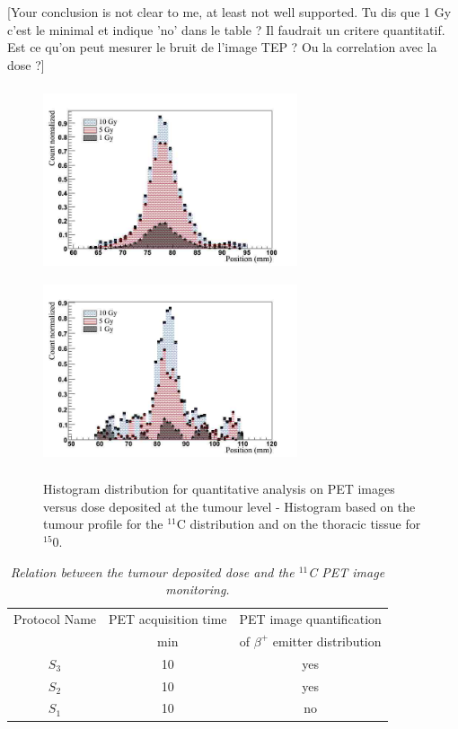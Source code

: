 \documentclass[11pt]{iopart}
\newcommand{\dsnote}[1]{{\color{green}[#1]}} %
\providecommand{\DIFaddendFL}{} %
\begin{document}
\dsnote{Your conclusion is not clear to me, at least not well
  supported. Tu dis que 1 Gy c'est le minimal et indique 'no' dans le
  table ? Il faudrait un critere quantitatif. Est ce qu'on peut
  mesurer le bruit de l'image TEP ? Ou la correlation avec la dose ?}

\begin{figure}[!htbp]
  \DIFaddendFL \begin{center}
    \includegraphics[width=75mm,height=55mm]{figures/histo_lung_C11_paper.jpg}
    \includegraphics[width=75mm,height=55mm]{figures/histo_lung_O15_paper.jpg}
    \caption{Histogram distribution for quantitative analysis on PET
      images versus dose deposited at the tumour level - Histogram
      based on the tumour profile for the $^{11}$C distribution and on
      the thoracic tissue for $^{15}$0.}
  \end{center}
  \label{fig:fig4}
\end{figure}

\begin{table}[htbp]
\begin{center}
\begin{tabular}{|c|c|c|} \hline
 Protocol Name  & PET acquisition time  & PET image quantification       \\
                              &  min                  & of $\beta^{+}$ emitter distribution       \\ \hline \hline

$S_{3}$              & 10                    &  yes                           \\ \hline
$S_{2}$              & 10                    &  yes                           \\ \hline
$S_{1}$              & 10                    &  no                            \\ \hline \hline 

\end{tabular}
\end{center} 
\caption{\it Relation between the tumour deposited dose and the $^{11}$C PET image monitoring.}
\label{tab:results}
\end{table}
\end{document}
